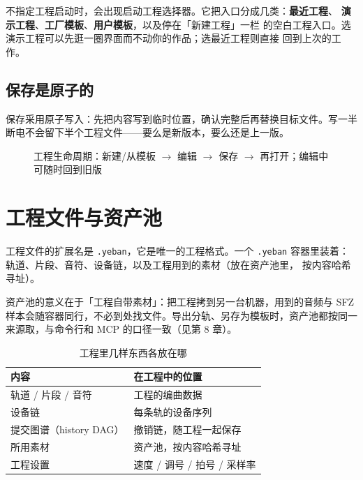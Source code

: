 不指定工程启动时，会出现启动工程选择器。它把入口分成几类：\textbf{最近工程}、
\textbf{演示工程}、\textbf{工厂模板}、\textbf{用户模板}，以及停在「新建工程」一栏
的空白工程入口。选演示工程可以先逛一圈界面而不动你的作品；选最近工程则直接
回到上次的工作。


\subsection{保存是原子的}

保存采用原子写入：先把内容写到临时位置，确认完整后再替换目标文件。写一半
断电不会留下半个工程文件——要么是新版本，要么还是上一版。

\begin{figure}[htbp]
\centering
{}
\caption{工程生命周期：新建/从模板 $\to$ 编辑 $\to$ 保存 $\to$ 再打开；编辑中可随时回到旧版}
\label{fig:ch02-lifecycle}
\end{figure}

\section{工程文件与资产池}

工程文件的扩展名是 \texttt{.yeban}，它是唯一的工程格式。一个 \texttt{.yeban}
容器里装着：轨道、片段、音符、设备链，以及工程用到的素材（放在资产池里，
按内容哈希寻址）。

资产池的意义在于「工程自带素材」：把工程拷到另一台机器，用到的音频与 SFZ
样本会随容器同行，不必到处找文件。导出分轨、另存为模板时，资产池都按同一
来源取，与命令行和 MCP 的口径一致（见第 8 章）。

\begin{table}[htbp]
\centering
\caption{工程里几样东西各放在哪}
\label{tab:ch02-container}
\begin{tabular}{ll}
\hline
内容 & 在工程中的位置 \\
\hline
轨道 / 片段 / 音符 & 工程的编曲数据 \\
设备链 & 每条轨的设备序列 \\
提交图谱（history DAG） & 撤销链，随工程一起保存 \\
所用素材 & 资产池，按内容哈希寻址 \\
工程设置 & 速度 / 调号 / 拍号 / 采样率 \\
\hline
\end{tabular}
\end{table}

